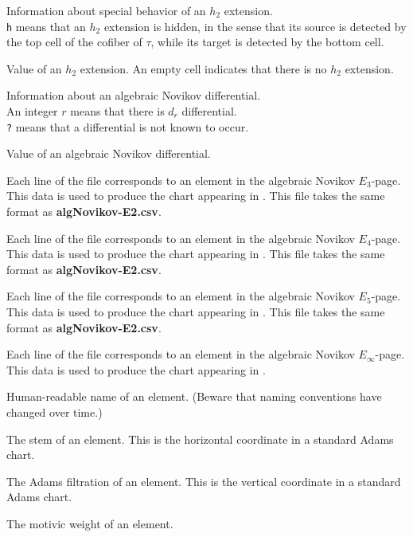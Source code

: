 \documentclass{amsart}
\begin{document}
Information about special behavior of an $h_2$ extension. \\
\texttt{h} means that an $h_2$ extension is hidden, in the sense
that its source is detected by the top cell of the cofiber of $\tau$,
while its target is detected by the bottom cell.

Value of an $h_2$ extension.  An empty cell indicates
that there is no $h_2$ extension. 

Information about an algebraic Novikov differential. \\
An integer $r$ means that there is $d_r$ differential. \\
\texttt{?} means that a differential is not known to occur.

Value of an algebraic Novikov differential.

\newpage

Each line of the file corresponds to an element in the
algebraic Novikov $E_3$-page.
This data is used to produce the chart appearing in \cite{IWX19a}.
This file takes the same format as
\textbf{algNovikov-E2.csv}.

Each line of the file corresponds to an element in the
algebraic Novikov $E_4$-page.
This data is used to produce the chart appearing in \cite{IWX19a}.
This file takes the same format as
\textbf{algNovikov-E2.csv}.

Each line of the file corresponds to an element in the
algebraic Novikov $E_5$-page.
This data is used to produce the chart appearing in \cite{IWX19a}.
This file takes the same format as
\textbf{algNovikov-E2.csv}.

\newpage

Each line of the file corresponds to an element in the
algebraic Novikov $E_\infty$-page.
This data is used to produce the chart appearing in \cite{IWX19a}.

  Human-readable name of an element.
(Beware that naming conventions have changed over time.)

 The stem of an element.  This is the
horizontal coordinate in a standard Adams chart.

 The Adams filtration of 
an element.  This is the vertical coordinate in a standard 
Adams chart.

 The motivic weight of an element.
\end{document}
